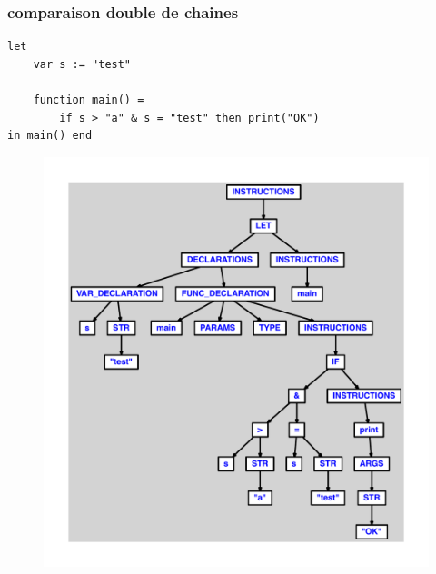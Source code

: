 \documentclass{article}
\begin{document}
\subsubsection{comparaison double de chaines}
\begin{lstlisting}
let
	var s := "test"

	function main() =
		if s > "a" & s = "test" then print("OK")
in main() end
\end{lstlisting}
\newpage
\begin{figure}[H]
\centering
\includegraphics[max width=\textwidth]{ast/ast_181.pdf}
\end{figure}
\newpage
\end{document}
